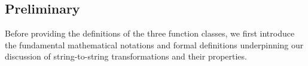 
\subsection{Preliminary}
Before providing the definitions of the three function classes, we first introduce the fundamental mathematical notations and formal definitions underpinning our discussion of string-to-string transformations and their properties.


